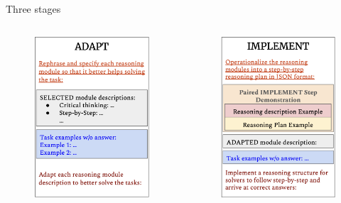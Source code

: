 \documentclass[aspectratio=169]{beamer}
\begin{document}
\begin{frame}{Three stages}
\begin{columns}
\begin{column}{0.3\textwidth}
\begin{figure}
    \includegraphics[width=0.8\linewidth]{adapt.png}
\end{figure}
\end{column}
\pause
\begin{column}{0.3\textwidth}
\begin{figure}
    \centering
    \includegraphics[width=0.8\linewidth]{implement.png}

\end{figure}
\end{column}
\end{columns}
\end{frame}
\end{document}

